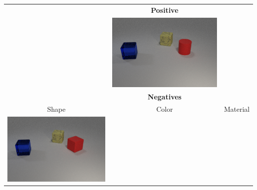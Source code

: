 
\begin{table}\centering
{}
\begin{tabular}{@{}ccc@{}}\toprule
&\textbf{Positive}& \\
&
\begin{minipage}{.3\textwidth}
  \includegraphics[width=\linewidth]{figures/clevr_datasets/SCLEVR3_original.png}
\end{minipage}
& \\
&\textbf{Negatives}& \\
\cmidrule{2-2}
Shape & Color & Material \\
    \begin{minipage}{.3\textwidth}
      \includegraphics[width=\linewidth]{figures/clevr_datasets/SCLEVR3_negshape.png}
    \end{minipage}
    &
    \begin{minipage}{.3\textwidth}

\end{minipage}
\end{tabular}
\end{table}
